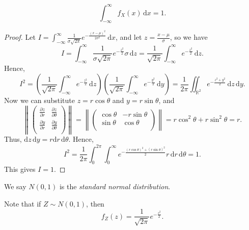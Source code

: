 \begin{claim}
    \[
        \int _{-\infty }^{\infty } f_X(x) \, \mathrm{d} x = 1.  
    \]
\end{claim}
\begin{proof}
    Let \(I = \int _{-\infty }^{\infty } \frac{1}{\sigma \sqrt{2 \pi } } e^{- \frac{(x - \mu )^2}{2 \sigma ^2}} \, \mathrm{d} x\), and let \(z = \frac{x - \mu}{\sigma }\), so we have 
    \[
        I = \int _{-\infty }^{\infty} \frac{1}{\sigma \sqrt{2\pi } } e^{- \frac{z^2}{2}} \sigma \, \mathrm{d} z = \frac{1}{\sqrt{2\pi } } \int _{-\infty }^{\infty } e^{- \frac{z^2}{2}} \, \mathrm{d} z.  
    \]  
    Hence,
    \[
        I^2 = \left( \frac{1}{\sqrt{2\pi } } \int _{-\infty }^{\infty} e^{- \frac{z^2}{2}} \, \mathrm{d} z  \right) \left( \frac{1}{\sqrt{2\pi } } \int _{-\infty }^{\infty} e^{- \frac{y^2}{2}} \, \mathrm{d} y  \right) = \frac{1}{2\pi } \iint_{\mathbb{R} ^2} e^{- \frac{z^2 + y^2}{2}} \, \mathrm{d} z \, \mathrm{d} y.  
    \]
    Now we can substitute \(z = r \cos \theta \) and \(y = r \sin \theta \), and 
    \[
        \left\lVert \begin{pmatrix}
            \frac{\partial z}{\partial r}  & \frac{\partial z}{\partial \theta}   \\
            \frac{\partial y}{\partial r}  & \frac{\partial y}{\partial \theta}   \\
        \end{pmatrix} \right\rVert = \left\lVert \begin{pmatrix}
            \cos \theta  & -r \sin \theta   \\
            \sin \theta  & \cos \theta  \\
        \end{pmatrix} \right\rVert = r \cos ^2 \theta + r \sin ^2 \theta = r.  
    \]  
    Thus, \(\mathrm{d} z \, \mathrm{d} y = r \mathrm{d} r \, \mathrm{d} \theta    \). Hence,
    \[
        I^2 = \frac{1}{2\pi} \int _0^{2\pi } \int _{0} ^{\infty} e^{-\frac{(r\cos \theta )^2 + (r \sin \theta )^2}{2}} r \, \mathrm{d} r \, \mathrm{d} \theta = 1.   
    \]
    This gives \(I = 1\). 
\end{proof}

\begin{definition}
    We say \(N(0, 1)\) is the \emph{standard normal distribution}.
\end{definition}

Note that if \(Z \sim N(0, 1)\), then 
\[
    f_Z(z) = \frac{1}{\sqrt{2\pi}} e^{-\frac{z^2}{2}}.
\] 

